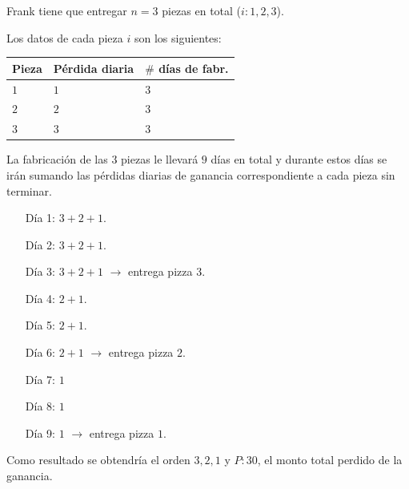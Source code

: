 \documentclass[11pt, a4paper, twoside]{article}
\begin{document}
\begin{ejemplo}\hspace{1em}

	Frank tiene que entregar $n=3$ piezas en total ($i:1,2,3$). 

	Los datos de cada pieza $i$ son los siguientes:

	\begin{center}
		\begin{tabular}{|l|l|l|}
			\hline
			Pieza &  Pérdida diaria & $\#$ días de fabr.\\
			\hline
			$1$   &     $1$         & $3$               \\
			\hline 
			$2$   &     $2$         & $3$               \\
			\hline 
			$3$   &     $3$         & $3$               \\
			\hline 
		\end{tabular}
	\end{center}

	La fabricación de las $3$ piezas le llevará $9$ días en total y durante estos
	días se irán sumando las pérdidas diarias de ganancia correspondiente a cada
	pieza sin terminar.

	
		\begin{itemize}[leftmargin=+6em]
			\item[Día 1:] $3+2+1$. 
			\item[Día 2:] $3+2+1$. 
			\item[Día 3:] $3+2+1$ $\rightarrow$ entrega pizza $3$.
			\item[Día 4:] $2+1$.
			\item[Día 5:] $2+1$. 
			\item[Día 6:] $2+1$ $\rightarrow$ entrega pizza $2$.
			\item[Día 7:] $1$
			\item[Día 8:] $1$
			\item[Día 9:] $1$ $\rightarrow$ entrega pizza $1$.
		\end{itemize}

	
		

	Como resultado se obtendría el orden $3,2,1$ y $P:30$, el monto total perdido
	de la ganancia.
\end{ejemplo}
\end{document}
